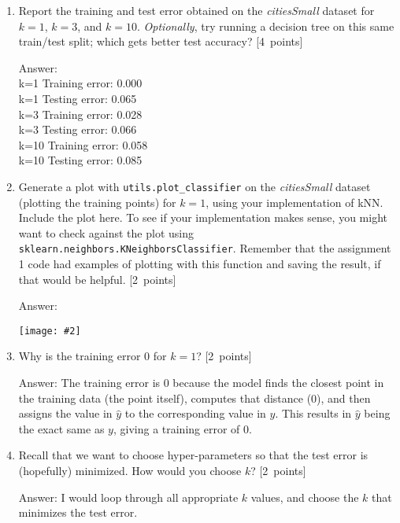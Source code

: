 \documentclass{article}
\newcommand{\blu}[1]{{\textcolor{blu}{#1}}}
\newenvironment{answer}{\par\begingroup\color{gre}Answer: }{\endgroup}
\let\ask\blu
\newcommand\pts[1]{\textcolor{pointscolour}{[#1~points]}}
\newcommand{\centerfig}[2]{\begin{center}\texttt{[image: \#2]}\end{center}}
\begin{document}
\begin{enumerate}
\begin{answer}
\begin{verbatim}
            return y_hat
        \end{verbatim}
        \end{answer}
        \item \ask{Report the training and test error} obtained on the \emph{citiesSmall} dataset for $k=1$, $k=3$, and $k=10$. \emph{Optionally}, try running a decision tree on this same train/test split; which gets better test accuracy? \pts{4}
        \begin{answer} \\
        k=1    Training error: 0.000 \\
        k=1    Testing error: 0.065 \\
        k=3    Training error: 0.028 \\
        k=3    Testing error: 0.066 \\
        k=10    Training error: 0.058 \\
        k=10    Testing error: 0.085
        \end{answer}
        \item Generate a plot with \texttt{utils.plot\_classifier} on the \emph{citiesSmall} dataset (plotting the training points) for $k=1$, using your implementation of kNN. \ask{Include the plot here.} To see if your implementation makes sense, you might want to check against the plot using \texttt{sklearn.neighbors.KNeighborsClassifier}. Remember that the assignment 1 code had examples of plotting with this function and saving the result, if that would be helpful. \pts{2}
        \begin{answer}
        \centerfig{.5}{figs/k1_graph.png}
        \end{answer}
        \item Why is the training error $0$ for $k=1$? \pts{2}
        \begin{answer}
        The training error is $0$ because the model finds the closest point in the training data (the point itself), computes that distance (0), and then assigns the value in $\hat{y}$ to the corresponding value in $y$. This results in $\hat{y}$ being the exact same as $y$, giving a training error of $0$. 
        \end{answer}
        \item Recall that we want to choose hyper-parameters so that the test error is (hopefully) minimized. How would you choose $k$? \pts{2}
        \begin{answer}
        I would loop through all appropriate $k$ values, and choose the $k$ that minimizes the test error. 
        \end{answer}
    \end{enumerate}
\end{document}
